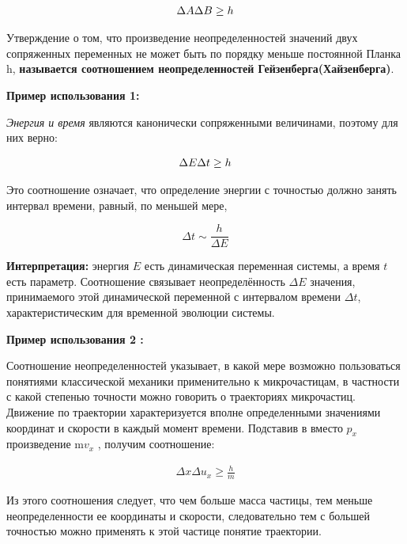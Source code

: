 \documentclass[__main__.tex]{subfiles}
\begin{document}
\begin{gather}
	\llabel{_28:heiz}
	\Delta A\Delta B\geq h
\end{gather}

Утверждение  о том, что произведение неопределенностей значений двух сопряженных переменных не может быть по порядку меньше постоянной Планка h, \textbf{называется соотношением неопределенностей Гейзенберга(Хайзенберга)}.

\textbf{Пример использования 1:}

\textit{Энергия и время} являются канонически сопряженными величинами, поэтому для них верно:

\begin{gather}
	\llabel{mynigga}
	\Delta E\Delta t\geq h
\end{gather}

Это соотношение означает, что определение энергии с точностью   должно занять интервал времени, равный, по меньшей мере,

$$
\Delta t \sim \frac{h}{\Delta E}
$$

\textbf{Интерпретация:} энергия $E$ есть динамическая переменная системы, а время $t$ есть параметр. Соотношение  связывает неопределённость $\Delta E$ значения, принимаемого этой динамической переменной с интервалом времени $\Delta t$, характеристическим для временной эволюции системы.

\textbf{Пример использования 2 :}

Соотношение неопределенностей указывает, в какой мере возможно пользоваться понятиями классической механики применительно к микрочастицам, в частности с какой степенью точности можно говорить о траекториях микрочастиц. Движение по траектории характеризуется вполне определенными значениями координат и скорости в каждый момент времени. Подставив в  вместо $p_{x}$  произведение m$v_x$  , получим соотношение:

\begin{gather}
	\Delta x\Delta u_{x}\geq \frac{h}{m}
\end{gather}

Из этого соотношения следует, что чем больше масса частицы, тем меньше неопределенности ее координаты и скорости, следовательно тем с большей точностью можно применять к этой частице понятие траектории. 
\end{document}
